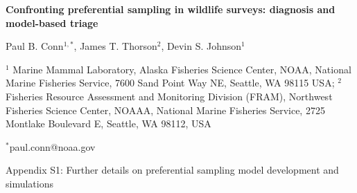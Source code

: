 \documentclass[times,mee,doublespace,]{besauth2}
\begin{document}
\begin{center} \bf {\large Confronting preferential sampling in wildlife surveys: diagnosis and model-based triage}

\rm

\vspace{0.7cm}
Paul B. Conn$^{1,*}$, James T. Thorson$^2$, Devin S. Johnson$^1$
\end{center}
\vspace{0.5cm}

\rm
\small


$^1$ Marine Mammal Laboratory, Alaska Fisheries Science Center, NOAA, National Marine Fisheries Service, 7600 Sand Point Way NE, Seattle, WA 98115 USA; $^2$ Fisheries Resource Assessment and Monitoring Division (FRAM), Northwest Fisheries Science Center, NOAAA, National Marine Fisheries Service, 2725 Montlake Boulevard E, Seattle, WA 98112, USA

$^*$paul.conn@noaa.gov

\large
\bigskip
\centerline{Appendix S1: Further details on preferential sampling model development and simulations}
\bigskip
\small

\linenumbers

\def\VAR{{\rm Var}\,}
\def\COV{{\rm Cov}\,}
\def\Prob{{\rm P}\,}
\end{document}
